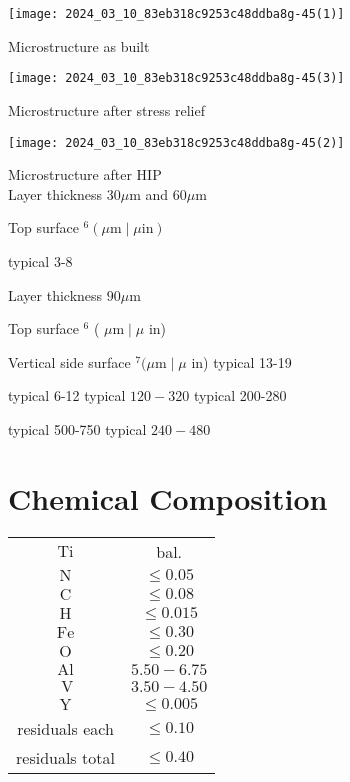 \documentclass[10pt]{article}
\begin{document}
\begin{center}
\texttt{[image: 2024\_03\_10\_83eb318c9253c48ddba8g-45(1)]}
\end{center}

Microstructure as built

\begin{center}
\texttt{[image: 2024\_03\_10\_83eb318c9253c48ddba8g-45(3)]}
\end{center}

Microstructure after stress relief

\begin{center}
\texttt{[image: 2024\_03\_10\_83eb318c9253c48ddba8g-45(2)]}
\end{center}

Microstructure after HIP\\
Layer thickness $30 \mu \mathrm{m}$ and $60 \mu \mathrm{m}$

Top surface ${ }^{6}(\mu \mathrm{m} \mid \mu \mathrm{in})$

typical 3-8

Layer thickness $90 \mu \mathrm{m}$

Top surface ${ }^{6}$ ( $\mu \mathrm{m} \mid \mu$ in)

Vertical side surface ${ }^{7}(\mu \mathrm{m} \mid \mu$ in) typical 13-19

typical 6-12 typical $120-320$ typical 200-280

typical 500-750 typical $240-480$

\section*{Chemical Composition}
\begin{center}
\begin{tabular}{c|c}
\hline
$\mathrm{Ti}$ & bal. \\
$\mathrm{N}$ & $\leq 0.05$ \\
$\mathrm{C}$ & $\leq 0.08$ \\
$\mathrm{H}$ & $\leq 0.015$ \\
$\mathrm{Fe}$ & $\leq 0.30$ \\
$\mathrm{O}$ & $\leq 0.20$ \\
$\mathrm{Al}$ & $5.50-6.75$ \\
$\mathrm{~V}$ & $3.50-4.50$ \\
$\mathrm{Y}$ & $\leq 0.005$ \\
residuals each & $\leq 0.10$ \\
residuals total & $\leq 0.40$ \\
\end{tabular}
\end{center}
\end{document}
